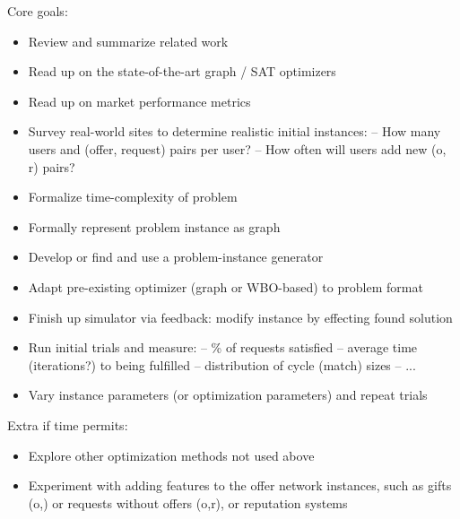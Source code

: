 \documentclass[11pt]{article}
\begin{document}
Core goals:
\begin{itemize}
\item Review and summarize related work \\
\item Read up on the state-of-the-art graph / SAT optimizers\\
\item Read up on market performance metrics \\
\item Survey real-world sites to determine realistic initial instances: \newline
	  -- How many users and (offer, request) pairs per user? \newline
	  -- How often will users add new (o, r) pairs?\\
\item Formalize time-complexity of problem \\
\item Formally represent problem instance as graph \\
\item Develop or find and use a problem-instance generator \\
\item Adapt pre-existing optimizer (graph or WBO-based) to problem format \\
\item Finish up simulator via feedback: modify instance by effecting found solution \\
\item Run initial trials and measure: \newline
	-- \% of requests satisfied \newline
	-- average time (iterations?) to being fulfilled \newline
	-- distribution of cycle (match) sizes \newline
	-- ...\\
\item Vary instance parameters (or optimization parameters) and repeat trials \\
\end{itemize}

Extra if time permits:
\begin{itemize}
\item Explore other optimization methods not used above \\
\item Experiment with adding features to the offer network instances, such as gifts (o,) or requests without offers (o,r), or reputation systems \\
\end{itemize}
\end{document}
